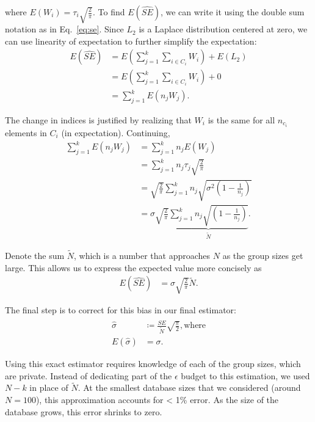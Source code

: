 \noindent where $E(W_i) = \tau_i \sqrt{\frac{2}{\pi}}$.  To find $E(\widehat{SE})$, we can write it using the double sum notation as in Eq.~\eqref{eq:se}. Since $L_2$ is a Laplace distribution centered at zero, we can use linearity of expectation to further simplify the expectation:
\begin{align*}
E(\widehat{SE}) &= E\left(\sum_{j=1}^k \sum_{i \in C_i} W_i\right)+ E(L_2)\\
&= E\left(\sum_{j=1}^k \sum_{i \in C_i} W_i \right) + 
0\\
&= \sum_{j=1}^k E\left(n_j W_j \right).
\end{align*}

\noindent The change in indices is justified by realizing that $W_i$ is the same for all $n_{c_i}$ elements in $C_i$ (in expectation). Continuing,
\begin{align*}
\sum_{j=1}^k E\left(n_j W_j \right) &= \sum_{j=1}^k n_j E\left(W_j \right) \\
&= \sum_{j=1}^k n_j \tau_j \sqrt{\frac{2}{\pi}} \\
&= \sqrt{\frac{2}{\pi}} \sum_{j=1}^k n_j \sqrt{\sigma^2\left(1 - \frac{1}{n_j}\right)}  \\
&= \sigma \sqrt{\frac{2}{\pi}} \underbrace{\sum_{j=1}^k n_j \sqrt{\left(1 - \frac{1}{n_j}\right)}}_{\tilde{N}}.
\end{align*}

\noindent Denote the sum $\tilde{N}$, which is a number that approaches $N$ as the group sizes get large. This allows us to express the expected value more concisely as
\begin{align*}
E(\widehat{SE}) &= \sigma \sqrt{\frac{2}{\pi}} \tilde{N}.
\end{align*}

The final step is to correct for this bias in our final estimator:
\begin{align*}
\hat{\sigma} &\coloneqq \frac{\widehat{SE}}{\tilde{N}}\sqrt{\frac{\pi}{2}}, \text{where}\\
E\left(\hat{\sigma}\right) &= \sigma.
\end{align*}

\noindent Using this exact estimator requires knowledge of each of the group sizes, which are private. Instead of dedicating part of the $\epsilon$ budget to this estimation, we used $N - k$ in place of $\tilde{N}$. At the smallest database sizes that we considered (around $N = 100$), this approximation accounts for < 1\% error. As the size of the database grows, this error shrinks to zero.

